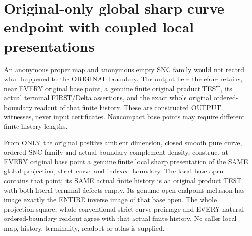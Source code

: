 \section{Original-only global sharp curve endpoint with coupled local presentations}

An anonymous proper map and anonymous empty SNC family would not record
what happened to the ORIGINAL boundary. The output here therefore
retains, near EVERY original base point, a genuine finite original
product TEST, its actual terminal FIRST/Delta assertions, and the exact
whole original ordered-boundary readout of that finite history. These
are constructed OUTPUT witnesses, never input certificates. Noncompact
base points may require different finite history lengths.

\begin{theorem}
\label{hir:sharp-actual-original-global-coupled-local-presentation}
\leanok
From ONLY the original positive ambient dimension, closed smooth pure
curve, ordered SNC family and actual boundary-complement density,
construct at EVERY original base point a genuine finite local sharp
presentation of the SAME global projection, strict curve and indexed
boundary. The local base open contains that point; its SAME actual
finite history is an original product TEST with both literal terminal
defects empty. Its genuine open endpoint inclusion has image exactly
the ENTIRE inverse image of that base open. The whole projection
square, whole conventional strict-curve preimage and EVERY natural
ordered-boundary readout agree with that actual finite history.
No caller local map, history, terminality, readout or atlas is supplied.
\end{theorem}
